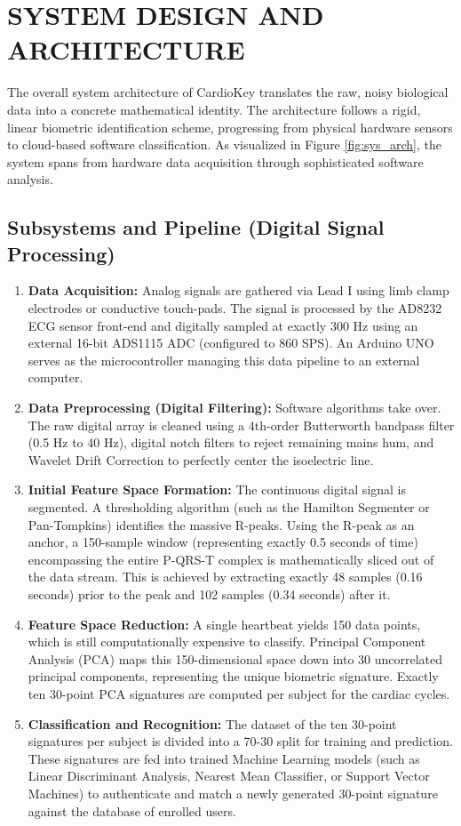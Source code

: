 \documentclass[12pt,a4paper]{report}
\begin{document}
\chapter{SYSTEM DESIGN AND ARCHITECTURE}
The overall system architecture of CardioKey translates the raw, noisy biological data into a concrete mathematical identity. The architecture follows a rigid, linear biometric identification scheme, progressing from physical hardware sensors to cloud-based software classification. As visualized in Figure \ref{fig:sys_arch}, the system spans from hardware data acquisition through sophisticated software analysis.

\section{Subsystems and Pipeline (Digital Signal Processing)}
\begin{enumerate}
\item \textbf{Data Acquisition:} Analog signals are gathered via Lead I using limb clamp electrodes or conductive touch-pads. The signal is processed by the AD8232 ECG sensor front-end and digitally sampled at exactly 300 Hz using an external 16-bit ADS1115 ADC (configured to 860 SPS). An Arduino UNO serves as the microcontroller managing this data pipeline to an external computer.
\item \textbf{Data Preprocessing (Digital Filtering):} Software algorithms take over. The raw digital array is cleaned using a 4th-order Butterworth bandpass filter (0.5 Hz to 40 Hz), digital notch filters to reject remaining mains hum, and Wavelet Drift Correction to perfectly center the isoelectric line.
\item \textbf{Initial Feature Space Formation:} The continuous digital signal is segmented. A thresholding algorithm (such as the Hamilton Segmenter or Pan-Tompkins) identifies the massive R-peaks. Using the R-peak as an anchor, a 150-sample window (representing exactly 0.5 seconds of time) encompassing the entire P-QRS-T complex is mathematically sliced out of the data stream. This is achieved by extracting exactly 48 samples (0.16 seconds) prior to the peak and 102 samples (0.34 seconds) after it. 
\item \textbf{Feature Space Reduction:} A single heartbeat yields 150 data points, which is still computationally expensive to classify. Principal Component Analysis (PCA) maps this 150-dimensional space down into 30 uncorrelated principal components, representing the unique biometric signature. Exactly ten 30-point PCA signatures are computed per subject for the cardiac cycles.
\item \textbf{Classification and Recognition:} The dataset of the ten 30-point signatures per subject is divided into a 70-30 split for training and prediction. These signatures are fed into trained Machine Learning models (such as Linear Discriminant Analysis, Nearest Mean Classifier, or Support Vector Machines) to authenticate and match a newly generated 30-point signature against the database of enrolled users. \\ 
\end{enumerate}
\end{document}
